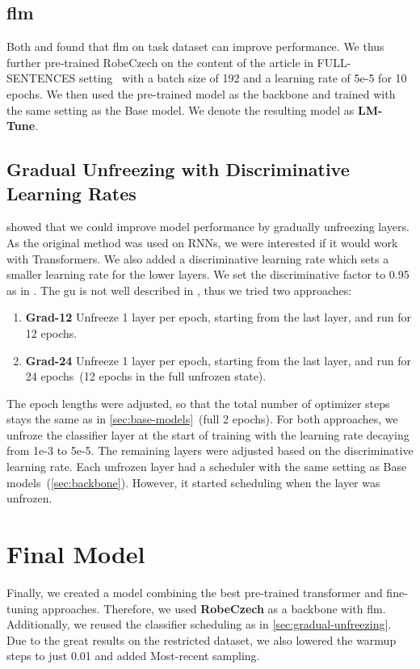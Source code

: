 \subsection{\acl{flm}}
\label{sec:task-modeling}
Both \textcite{howardUniversalLanguageModel2018a} and \textcite{sunHowFineTuneBERT2020}
found that \acf{flm} on task dataset can improve performance.
We thus further pre-trained RobeCzech on the content of the article in FULL-SENTENCES setting~\parencite{liuRoBERTaRobustlyOptimized2019}
with a batch size of 192 and a learning rate of 5e-5 for
10 epochs.  We then used the pre-trained model as the backbone and trained with the same setting as the Base model.
We denote the resulting model as \textbf{LM-Tune}.

\subsection{Gradual Unfreezing with Discriminative Learning Rates}
\label{sec:gradual-unfreezing}
\textcite{howardUniversalLanguageModel2018a} showed that we could improve model performance by gradually unfreezing layers.
As the original method was used on RNNs, we were interested if it would work with Transformers.
We also added a discriminative learning rate which sets a smaller learning rate for the lower layers.
We set the discriminative factor to 0.95 as in \parencite{sunHowFineTuneBERT2020}.
The \ac{gu} is not well described in \parencite{howardUniversalLanguageModel2018a}, thus we tried two approaches:
\begin{enumerate}
    \item \textbf{Grad-12} Unfreeze 1 layer per epoch, starting from the last layer, and run for 12 epochs.
    \item \textbf{Grad-24} Unfreeze 1 layer per epoch,
    starting from the last layer, and run for 24 epochs~(12 epochs in the full unfrozen state).
\end{enumerate}
The epoch lengths were adjusted, so that the total number of optimizer steps stays the same as in \autoref{sec:base-models}~(full 2 epochs).
For both approaches, we unfroze the classifier layer at the start of training with the learning rate decaying from 1e-3 to 5e-5.
The remaining layers were adjusted based on the discriminative learning rate.
Each unfrozen layer had a scheduler with the same setting as Base models~(\autoref{sec:backbone}).
However, it started scheduling when the layer was unfrozen.

\section{Final Model}
\label{sec:final-model}
Finally, we created a model combining the best pre-trained transformer and fine-tuning approaches.
Therefore, we used \textbf{RobeCzech} as a backbone with \ac{flm}.
Additionally, we reused the classifier scheduling as in \autoref{sec:gradual-unfreezing}.
Due to the great results on the restricted dataset, we also lowered the warmup steps to just 0.01 and added
Most-recent sampling.
